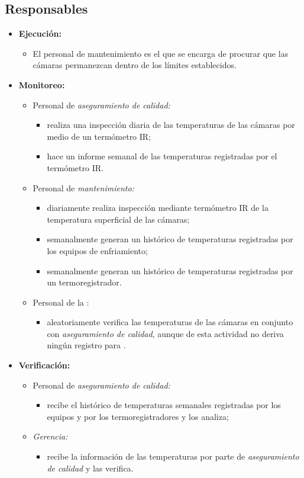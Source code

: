 \subsection{Responsables}

\begin{itemize}
	\item \textbf{Ejecución:}
	\begin{itemize}
		\item El personal de mantenimiento es el que se encarga de procurar que las cámaras permanezcan dentro de los límites establecidos.
	\end{itemize}
	\item \textbf{Monitoreo:}
	\begin{itemize}
		\item Personal de \emph{aseguramiento de calidad:}
		\begin{itemize}
			\item realiza una inspección diaria de las temperaturas de las cámaras por medio de un termómetro IR;
			\item hace un informe semanal de las temperaturas registradas por el termómetro IR.
		\end{itemize}
		\item Personal de \emph{mantenimiento:}
		\begin{itemize}
			\item diariamente realiza inspección mediante termómetro IR de la temperatura superficial de las cámaras;
			\item semanalmente generan un histórico de temperaturas registradas por los equipos de enfriamiento;
			\item semanalmente generan un histórico de temperaturas registradas por un termoregistrador.
		\end{itemize}
		\item Personal de la :
		\begin{itemize}
			\item aleatoriamente verifica las temperaturas de las cámaras en conjunto con \emph{aseguramiento de calidad}, aunque de esta actividad no deriva ningún registro para .
		\end{itemize}
	\end{itemize}
	\item \textbf{Verificación:}
	\begin{itemize}
		\item Personal de \emph{aseguramiento de calidad:}
		\begin{itemize}
			\item recibe el histórico de temperaturas semanales registradas por los equipos y por los termoregistradores y los analiza;
		\end{itemize}
		\item \emph{Gerencia:}
		\begin{itemize}
			\item recibe la información de las temperaturas por parte de \emph{aseguramiento de calidad} y las verifica.
		\end{itemize}
	\end{itemize}
\end{itemize}

